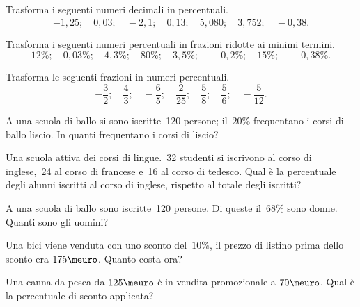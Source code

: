 \begin{esercizio}
\label{ese:3.80}
Trasforma i seguenti numeri decimali in percentuali.
\[-1,25;\quad0,03;\quad-2,\overline{1};\quad0,\overline{13};\quad5,080;
\quad3,7\overline{52};\quad-0,38.\]
\end{esercizio}

\begin{esercizio}
\label{ese:3.81}
Trasforma i seguenti numeri percentuali in frazioni ridotte ai minimi 
termini.
\[12\%;\quad0,03\%;\quad4,3\%;\quad80\%;\quad3,5\%;\quad-0,2\%;\quad15\%;
\quad-0,38\%.\]
\end{esercizio}

\begin{esercizio}
\label{ese:3.82}
Trasforma le seguenti frazioni in numeri percentuali.
\[-\frac{3}{2};\quad\frac{4}{3};\quad-\frac{6}{5};\quad\frac{2}{25};
\quad\frac{5}{8};\quad\frac{5}{6};\quad-\frac{5}{12}.\]
\end{esercizio}

\begin{esercizio}
\label{ese:3.83}
A una scuola di ballo si sono iscritte~120 persone; il~\(20\%\) frequentano 
i corsi di ballo liscio. In quanti frequentano i corsi di liscio?
\end{esercizio}

\begin{esercizio}
\label{ese:3.84}
Una scuola attiva dei corsi di lingue.~32 studenti si iscrivono al corso 
di inglese,~24 al corso di francese e~16 al corso di tedesco.
Qual è la percentuale degli alunni iscritti al corso di inglese, rispetto 
al totale degli iscritti?
\end{esercizio}

\begin{esercizio}
\label{ese:3.85}
A una scuola di ballo sono iscritte~120 persone. Di queste il~\(68\%\) sono 
donne. Quanti sono gli uomini?
\end{esercizio}

\begin{esercizio}
\label{ese:3.86}
 Una bici viene venduta con uno sconto del~\(10\%\), il prezzo di listino 
 prima dello sconto era \(175\meuro\). Quanto costa ora?
\end{esercizio}

\begin{esercizio}[*]
\label{ese:3.87}
Una canna da pesca da \(125\meuro\) è in vendita promozionale a 
\(70\meuro\). Qual è la percentuale di sconto applicata? \hfill
{}
\end{esercizio}

